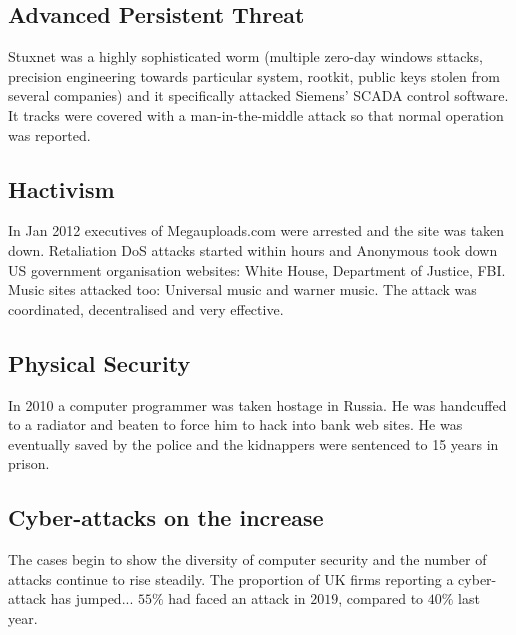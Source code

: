 \documentclass[a4paper]{article}
\theoremstyle{plain}
\theoremstyle{definition}
\theoremstyle{remark}
\begin{document}
\subsection{Advanced Persistent Threat}
Stuxnet was a highly sophisticated worm (multiple zero-day windows sttacks, precision engineering towards particular system, rootkit, public keys stolen from several companies) and it specifically attacked Siemens' SCADA control software. It tracks were covered with a man-in-the-middle attack so that normal operation was reported.
\subsection{Hactivism}
In Jan 2012 executives of Megauploads.com were arrested and the site was taken down. Retaliation DoS attacks started within hours and Anonymous took down US government organisation websites: White House, Department of Justice, FBI. Music sites attacked too: Universal music and warner music. The attack was coordinated, decentralised and very effective.
\subsection{Physical Security}
In 2010 a computer programmer was taken hostage in Russia. He was handcuffed to a radiator and beaten to force him to hack into bank web sites. He was eventually saved by the police and the kidnappers were sentenced to 15 years in prison.
\subsection{Cyber-attacks on the increase}
The cases begin to show the diversity of computer security and the number of attacks continue to rise steadily. The proportion of UK firms reporting a cyber-attack has jumped... $55\%$ had faced an attack in $2019$, compared to $40\%$ last year.
\end{document}
